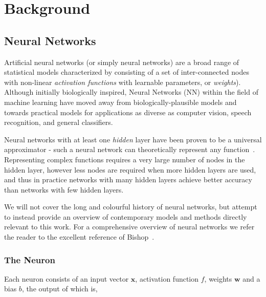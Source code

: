 \documentclass[thesis]{subfiles}
\begin{document}


\chapter{Background}
\label{background}

\section{Neural Networks}
Artificial neural networks (or simply neural networks) are a broad range of statistical models characterized by consisting of a set of inter-connected nodes with non-linear \emph{activation functions} with learnable parameters, or \emph{weights}). Although initially biologically inspired, Neural Networks (NN) within the field of machine learning have moved away from biologically-plausible models and towards practical models for applications as diverse as computer vision, speech recognition, and general classifiers.

Neural networks with at least one \emph{hidden} layer have been proven to be a universal approximator - \ie such a neural network can theoretically represent any function~\cite{journals/mcss/Cybenko92,hornik89a}. Representing complex functions requires a very large number of nodes in the hidden layer, however less nodes are required when more hidden layers are used, and thus in practice networks with many hidden layers achieve better accuracy than networks with few hidden layers. 

We will not cover the long and colourful history of neural networks, but attempt to instead provide an overview of contemporary models and methods directly relevant to this work. For a comprehensive overview of neural networks we refer the reader to the excellent reference of Bishop~\cite{Bishop1995}.


\subsection{The Neuron}
Each neuron consists of an input vector $\mathbf{x}$, activation function $f$, weights $\mathbf{w}$ and a bias $b$, the output of which is,
\end{document}

